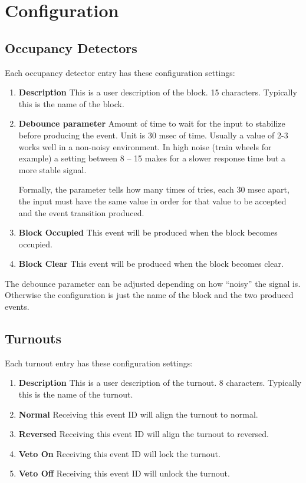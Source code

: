 \clearpage
\section{Configuration}

\subsection{Occupancy Detectors}

Each occupancy detector entry has these configuration settings:

\begin{enumerate}
\item \textbf{Description} This is a user description of the block. 15 
characters.  Typically this is the name of the block.
\item \textbf{Debounce parameter} Amount of time to wait for the input to 
stabilize before producing the event. Unit is 30 msec of time. Usually a value 
of 2-3 works well in a non-noisy environment. In high noise (train wheels for 
example) a setting between 8 -- 15 makes for a slower response time but a more 
stable signal.

Formally, the parameter tells how many times of tries, each 30 msec apart, the 
input must have the same value in order for that value to be accepted and the 
event transition produced.
\item \textbf{Block Occupied} This event will be produced when the block 
becomes occupied.
\item \textbf{Block Clear} This event will be produced when the block becomes 
clear.
\end{enumerate}

The debounce parameter can be adjusted depending on how ``noisy'' the signal 
is.  Otherwise the configuration is just the name of the block and the two 
produced events.

\subsection{Turnouts}

Each turnout entry has these configuration settings:

\begin{enumerate}
\item \textbf{Description} This is a user description of the turnout. 8 
characters.  Typically this is the name of the turnout.
\item \textbf{Normal} Receiving this event ID will align the turnout to 
normal.
\item \textbf{Reversed} Receiving this event ID will align the turnout to 
reversed.
\item \textbf{Veto On} Receiving this event ID will lock the turnout.
\item \textbf{Veto Off} Receiving this event ID will unlock the turnout.
\end{enumerate}

